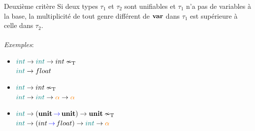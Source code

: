 \documentclass[serif]{beamer}
\newcommand{\exemples}{\textit{Exemples}\xspace}
\newcommand{\unit}{\bold{unit}}
\newcommand{\T}{\mathrm{T}}
\begin{document}
\begin{frame}{Deuxième critère}
Si deux types $\tau_1$ et $\tau_2$ sont unifiables et $\tau_1$ n'a pas de variables à la base, la multiplicité de tout genre différent de $\bold{var}$ dans $\tau_1$ est supérieure à celle dans $\tau_2$.
\\~\\
\exemples :
\begin{itemize}
  \item
    $\textcolor{teal}{int} \rightarrow \textcolor{teal}{int} \rightarrow int \nsim_\T$ \\
    $\textcolor{teal}{int} \rightarrow float$
  \item
    $\textcolor{teal}{int} \rightarrow int \nsim_\T$ \\
    $\textcolor{teal}{int} \rightarrow \textcolor{teal}{int} \rightarrow \textcolor{orange}{\alpha} \rightarrow \textcolor{orange}{\alpha}$
  \item
    $\textcolor{teal}{int} \rightarrow (\unit \,\textcolor{blue}{\rightarrow}\, \unit) \rightarrow \unit \nsim_\T$ \\
    $\textcolor{teal}{int} \rightarrow (int \,\textcolor{blue}{\rightarrow}\, float) \rightarrow \textcolor{teal}{int} \rightarrow \textcolor{orange}{\alpha}$
\end{itemize}
\end{frame}

\end{document}
